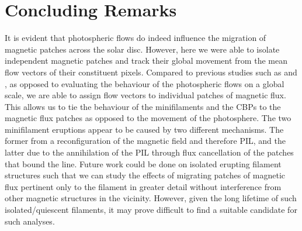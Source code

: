 \section{Concluding Remarks}
It is evident that photospheric flows do indeed influence the migration of magnetic patches across the solar disc. However, here we were able to isolate independent magnetic patches and track their global movement from the mean flow vectors of their constituent pixels. Compared to previous studies such as \cite{roudier_horizontal_2018} and \cite{muglach_photospheric_2021}, as opposed to evaluating the behaviour of the photospheric flows on a global scale, we are able to assign flow vectors to individual patches of magnetic flux. This allows us to tie the behaviour of the minifilaments and the CBPs to the magnetic flux patches as opposed to the movement of the photosphere. The two minifilament eruptions appear to be caused by two different mechanisms. The former from a reconfiguration of the magnetic field and therefore PIL, and the latter due to the annihilation of the PIL through flux cancellation of the patches that bound the line. Future work could be done on isolated erupting filament structures such that we can study the effects of migrating patches of magnetic flux pertinent only to the filament in greater detail without interference from other magnetic structures in the vicinity. However, given the long lifetime of such isolated/quiescent filaments, it may prove difficult to find a suitable candidate for such analyses.